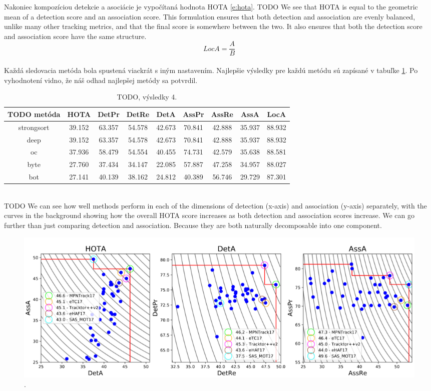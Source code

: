 Nakoniec kompozíciou detekcie a asociácie je vypočítaná hodnota HOTA \ref{e:hota}. TODO We see that HOTA is equal to the geometric mean of a detection score and an association score. This formulation ensures that both detection and association are evenly balanced, unlike many other tracking metrics, and that the final score is somewhere between the two. It also ensures that both the detection score and association score have the same structure.
\begingroup
\large
\begin{equation}
LocA = \frac{A}{B}
\label{e:hota}
\end{equation}
\endgroup
\\
Každá sledovacia metóda bola spustená viackrát s iným nastavením. Najlepšie výsledky pre každú metódu sú zapísané v tabuľke \ref{table:hota1}. Po vyhodnotení vidno, že náš odhad najlepšej metódy sa potvrdil.
\\
\begin{table}[ht]
\centering
\begin{tabular}{|c c c c c c c c c|} 
 \hline
TODO metóda & HOTA & DetPr & DetRe & DetA & AssPr & AssRe & AssA & LocA \\ [0.5ex] 
 \hline
strongsort & 39.152 & 63.357 & 54.578 & 42.673 & 70.841 & 42.888 & 35.937 & 88.932 \\ [0.1ex]
deep & 39.152 & 63.357 & 54.578 & 42.673 & 70.841 & 42.888 & 35.937 & 88.932 \\ [0.1ex]
oc & 37.936 & 58.479 & 54.554 & 40.455 & 74.731 & 42.579 & 35.638 & 88.581 \\ [0.1ex]
byte & 27.760 & 37.434 & 34.147 & 22.085 & 57.887 & 47.258 & 34.957 & 88.027 \\ [0.1ex]
bot & 27.141 & 40.139 & 38.162 & 24.812 & 40.389 & 56.746 & 29.729 & 87.301 \\ [0.1ex]
 \hline
\end{tabular}
\caption{TODO, výsledky 4.}
\label{table:hota1}
\end{table}
\\
TODO We can see how well methods perform in each of the dimensions of detection (x-axis) and association (y-axis) separately, with the curves in the background showing how the overall HOTA score increases as both detection and association scores increase. We can go further than just comparing detection and association. Because they are both naturally decomposable into one component.
\begin{figure}[ht]
    \centering
    \includegraphics[width=1\textwidth]{images/05/compare.png}
    \caption{.}
    \label{img:road}
\end{figure}

